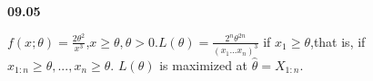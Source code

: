 {\bf 09.05}

$f(x;\theta)=\frac{2\theta^2}{x^3}$,$x\geq\theta,\theta>0. L(\theta)=\frac{2^n\theta^{2n}}{(x_1...x_n)^3}$ if $x_1\geq\theta$,that is, if $x_{1:n}\geq\theta,
...,x_n\geq\theta$. $L(\theta)$ is maximized at $\hat{\theta}=X_{1:n}$.